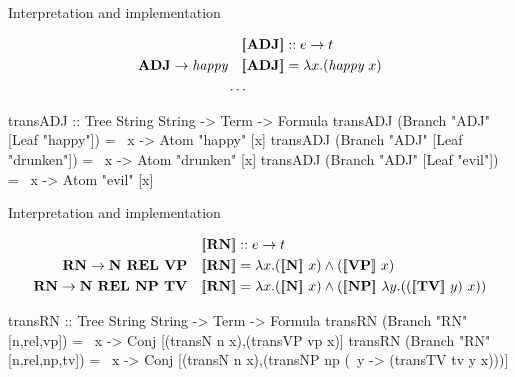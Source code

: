 \documentclass[xcolor=dvipsnames]{beamer}
\newcommand{\sem}[1]{\ensuremath{[\hspace{-1.8pt}[ #1 ]\hspace{-1.8pt}]}}
\begin{document}
\begin{frame}[fragile]{Interpretation and implementation}

\begin{align*}
&\quad \sem{\textbf{ADJ}} :: e\to t \\
\textbf{ADJ} \to \text{\em happy} &\quad \sem{\textbf{ADJ}} = \lambda x.(\text{\em happy}\ x) \\
& \ldots 
\end{align*}
\begin{code}
transADJ :: Tree String String -> Term -> Formula
transADJ (Branch "ADJ" [Leaf "happy"]) = 
                                  \ x -> Atom "happy" [x]
transADJ (Branch "ADJ" [Leaf "drunken"]) = 
                                  \ x -> Atom "drunken" [x]
transADJ (Branch "ADJ" [Leaf "evil"])  = 
                                  \ x -> Atom "evil" [x]
\end{code}
\end{frame}


\begin{frame}[fragile]{Interpretation and implementation}

\begin{align*}
&\quad \sem{\textbf{RN}} :: e\to t \\
\textbf{RN} \to \textbf{N\ REL\ VP} &\quad \sem{\textbf{RN}} = \lambda x.(\sem{\textbf{N}}\ x)\land (\sem{\textbf{VP}}\ x) \\
\textbf{RN} \to \textbf{N\ REL\ NP TV} &\quad \sem{\textbf{RN}} = \lambda x.(\sem{\textbf{N}}\ x)\land (\sem{\textbf{NP}}\ \lambda y.((\sem{\textbf{TV}}\ y)\ x)) 
\end{align*}
\begin{code}
transRN :: Tree String String -> Term -> Formula
transRN (Branch "RN" [n,rel,vp])    = 
              \ x -> Conj [(transN n x),(transVP vp x)]
transRN (Branch "RN" [n,rel,np,tv]) = 
              \ x -> Conj [(transN n x),(transNP np (\ y -> (transTV tv y x)))]
\end{code}
\end{frame}
\end{document}
